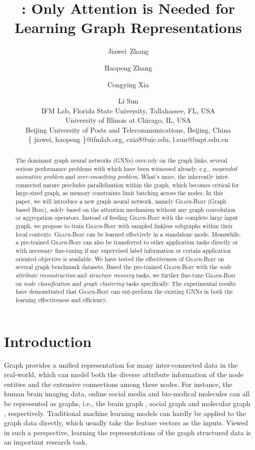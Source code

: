 \documentclass{article}
\title{{\our}: Only Attention is Needed for Learning Graph Representations}
\author{Jiawei~Zhang \and Haopeng Zhang \and Congying Xia \and Li Sun\\
\affiliations
IFM Lab, Florida State University, Tallahassee, FL, USA\\
University of Illinois at Chicago, IL, USA\\
Beijing University of Posts and Telecommunications, Beijing, China\\
 \emails
 \{ jiawei, haopeng \}@ifmlab.org, cxia8@uic.edu, l.sun@bupt.edu.cn}
\newcommand{\our}{\textsc{Graph-Bert}}
\newcommand{\bert}{\textsc{Bert}}
\begin{document}
\maketitle

\begin{abstract}

The dominant graph neural networks (GNNs) over-rely on the graph links, several serious performance problems with which have been witnessed already, e.g., \textit{suspended animation problem} and \textit{over-smoothing problem}. What's more, the inherently inter-connected nature precludes parallelization within the graph, which becomes critical for large-sized graph, as memory constraints limit batching across the nodes. In this paper, we will introduce a new graph neural network, namely {\our} (Graph based {\bert}), solely based on the attention mechanism without any graph convolution or aggregation operators. Instead of feeding {\our} with the complete large input graph, we propose to train {\our} with sampled linkless subgraphs within their local contexts. {\our} can be learned effectively in a standalone mode. Meanwhile, a pre-trained {\our} can also be transferred to other application tasks directly or with necessary fine-tuning if any supervised label information or certain application oriented objective is available. We have tested the effectiveness of {\our} on several graph benchmark datasets. Based the pre-trained {\our} with the \textit{node attribute reconstruction} and \textit{structure recovery} tasks, we further fine-tune {\our} on \textit{node classification} and \textit{graph clustering} tasks specifically. The experimental results have demonstrated that {\our} can out-perform the existing GNNs in both the learning effectiveness and efficiency. 

\end{abstract}
\section{Introduction}\label{sec:introduction}




Graph provides a unified representation for many inter-connected data in the real-world, which can model both the diverse attribute information of the node entities and the extensive connections among these nodes. For instance, the human brain imaging data, online social media and bio-medical molecules can all be represented as graphs, i.e., the brain graph \cite{Meng_Isomorphic_19}, social graph \cite{Ugander_Anatomy_11} and molecular graph \cite{Jin_Junction_18}, respectively. Traditional machine learning models can hardly be applied to the graph data directly, which usually take the feature vectors as the inputs. Viewed in such a perspective, learning the representations of the graph structured data is an important research task.
\end{document}
